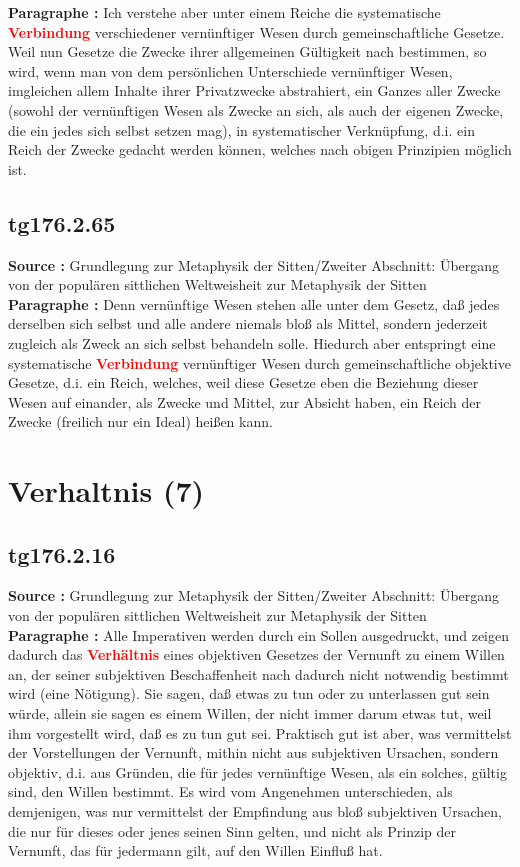 \documentclass[a4paper,12pt,twoside]{book}
\newcommand{\match}[1]{\textcolor{red}{\textbf{#1}}}
\newcommand{\unnumberedsection}[1]{
	\section*{#1}
	\addcontentsline{toc}{section}{#1}
	\markright{#1}
}
\begin{document}
	\noindent\textbf{Paragraphe : }Ich verstehe aber unter einem Reiche die systematische \match{Verbindung} verschiedener vernünftiger Wesen durch gemeinschaftliche Gesetze. Weil nun Gesetze die Zwecke ihrer allgemeinen Gültigkeit nach bestimmen, so wird, wenn man von dem persönlichen Unterschiede vernünftiger Wesen, imgleichen allem Inhalte ihrer Privatzwecke abstrahiert, ein Ganzes aller Zwecke (sowohl der vernünftigen Wesen als Zwecke an sich, als auch der eigenen Zwecke, die ein jedes sich selbst setzen mag), in systematischer Verknüpfung, d.i. ein Reich der Zwecke gedacht werden können, welches nach obigen Prinzipien möglich ist. 
	
	\subsection*{tg176.2.65} 
	\textbf{Source : }Grundlegung zur Metaphysik der Sitten/Zweiter Abschnitt: Übergang von der populären sittlichen Weltweisheit zur Metaphysik der Sitten\\  
	
	\noindent\textbf{Paragraphe : }Denn vernünftige Wesen stehen alle unter dem Gesetz, daß jedes derselben sich selbst und alle andere niemals bloß als Mittel, sondern jederzeit zugleich als Zweck an sich selbst behandeln solle. Hiedurch aber entspringt eine systematische \match{Verbindung} vernünftiger Wesen durch gemeinschaftliche objektive Gesetze, d.i. ein Reich, welches, weil diese Gesetze eben die Beziehung dieser Wesen auf einander, als Zwecke und Mittel, zur Absicht haben, ein Reich der Zwecke (freilich nur ein Ideal) heißen kann. 
	
	\unnumberedsection{Verhaltnis (7)} 
	\subsection*{tg176.2.16} 
	\textbf{Source : }Grundlegung zur Metaphysik der Sitten/Zweiter Abschnitt: Übergang von der populären sittlichen Weltweisheit zur Metaphysik der Sitten\\  
	
	\noindent\textbf{Paragraphe : }
	Alle Imperativen werden durch ein Sollen ausgedruckt, und zeigen dadurch das \match{Verhältnis} eines objektiven Gesetzes der Vernunft zu einem Willen an, der seiner subjektiven Beschaffenheit nach dadurch nicht notwendig bestimmt wird (eine Nötigung). Sie sagen, daß etwas zu tun oder zu unterlassen gut sein würde, allein sie sagen es einem Willen, der nicht immer darum etwas tut, weil ihm vorgestellt wird, daß es zu tun gut sei. Praktisch gut ist aber, was vermittelst der Vorstellungen der Vernunft, mithin nicht aus subjektiven Ursachen, sondern objektiv, d.i. aus Gründen, die für jedes vernünftige Wesen, als ein solches, gültig sind, den Willen bestimmt. Es wird vom Angenehmen unterschieden, als demjenigen, was nur vermittelst der Empfindung aus bloß subjektiven Ursachen, die nur für dieses oder jenes seinen Sinn gelten, und nicht als Prinzip der Vernunft, das für jedermann gilt, auf den Willen Einfluß hat.
	
\end{document}
